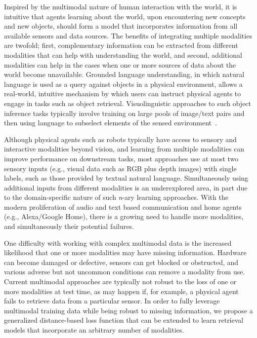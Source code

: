 \documentclass[10pt]{article} %
\begin{document}
Inspired by the multimodal nature of human interaction with the world, it is intuitive that agents learning about the world, upon encountering new concepts and new objects, should form a model that incorporates information from all available sensors and data sources. The benefits of integrating multiple modalities are twofold; first, complementary information can be extracted from different modalities that can help with understanding the world, and second, additional modalities can help in the cases when one or more sources of data about the world become unavailable.
% 
Grounded language understanding, in which natural language is used as a query against objects in a physical environment, allows a real-world, intuitive mechanism by which users can instruct physical agents to engage in tasks such as object retrieval. Visuolinguistic approaches to such object inference tasks typically involve training on large pools of image/text pairs and then using language to subselect elements of the sensed environment~\citep{hong2021gilbert,Zhuge_2021_CVPR_VLP}.

Although physical agents such as robots typically have access to sensory and interactive modalities beyond vision, and learning from multiple modalities can improve performance on downstream tasks, most approaches use at most two sensory inputs (e.g., visual data such as RGB plus depth images) with single labels, such as those provided by textual natural language. Simultaneously using additional inputs from different modalities is an underexplored area, in part due to the domain-specific nature of such \textit{n}-ary learning approaches. With the modern proliferation of audio and text based communication and home agents (e.g., Alexa/Google Home), there is a growing need to handle more modalities, and simultaneously their potential failures. 

One difficulty with working with complex multimodal data is the increased likelihood that one or more modalities may have missing information. Hardware can become damaged or defective, sensors can get blocked or obstructed, and various adverse but not uncommon conditions can remove a modality from use.
Current multimodal approaches are typically not robust to the loss of one or more modalities at test time, as may happen if, for example, a physical agent fails to retrieve data from a particular sensor. In order to fully leverage multimodal training data while being robust to missing information, we propose a generalized distance-based loss function that can be extended to learn retrieval models that incorporate an arbitrary number of modalities.
\end{document}
